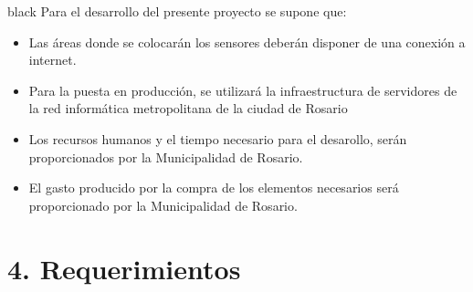 \documentclass[11pt]{charter}
\begin{document}
\begin{consigna}{black}
Para el desarrollo del presente proyecto se supone que:

\begin{itemize}
\item Las áreas donde se colocarán los sensores deberán disponer de una conexión a internet.
\item Para la puesta en producción, se utilizará la infraestructura de servidores de la red informática metropolitana de la ciudad de Rosario
\item Los recursos humanos y el tiempo necesario para el desarollo, serán proporcionados por la Municipalidad de Rosario.
\item El gasto producido por la compra de los elementos necesarios será proporcionado por la Municipalidad de Rosario.
\end{itemize}

\end{consigna}

\section{4. Requerimientos}
\label{sec:requerimientos}
\end{document}
